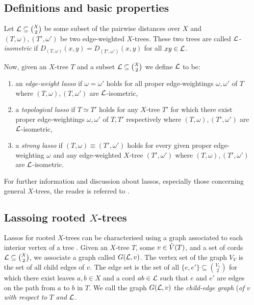 \subsection{Definitions and basic properties}
\label{sec:defin-basic-prop}

Let ${\mathcal L} \subseteq {X \choose 2}$ be some subset of the pairwise distances
over $X$ and $(T,\omega), (T',\omega')$ be two edge-weighted $X$-trees.  These
two trees are called \textit{${\mathcal L}$-isometric} if $D_{(T,\omega)}(x,y) =
D_{(T',\omega')}(x,y)$ for all $xy \in {\mathcal L}$.

Now, given an $X$-tree $T$ and a subset ${\mathcal L} \subseteq {X \choose 2}$ we
define ${\mathcal L}$ to be:
\begin{enumerate}[label=(\roman*)]
\item an \textit{edge-weight lasso} if $\omega = \omega'$ holds for all proper
  edge-weightings $\omega,\omega'$ of $T$ where $(T,\omega),(T,\omega')$ are
  ${\mathcal L}$-isometric,
\item a \textit{topological lasso} if $T \simeq T'$ holds for any $X$-tree
  $T'$ for which there exist proper edge-weightings $\omega,\omega'$ of $T,T'$
  respectively where $(T,\omega),(T',\omega')$ are ${\mathcal L}$-isometric,
\item a \textit{strong lasso} if $(T,\omega) \equiv (T',\omega')$ holds for
  every given proper edge-weighting $\omega$ and any edge-weighted $X$-tree
  $(T',\omega')$ where $(T,\omega),(T',\omega')$ are ${\mathcal L}$-isometric.
\end{enumerate}

For further information and discussion about lassos, especially those
concerning general $X$-trees, the reader is referred to \citep{DHS11}.

\subsection{Lassoing rooted $X$-trees}
\label{sec:lassoing-rooted-x}

Lassos for rooted $X$-trees can be characterised using a graph associated to
each interior vertex of a tree \citep{HP13}.  Given an $X$-tree $T$, some $v
\in \mathring{V}(T)$, and a set of cords ${\mathcal L} \subseteq {X \choose 2}$, we associate a
graph called $G({\mathcal L},v)$.  The vertex set of the graph $V_V$ is the set of all
child edges of $v$.  The edge set is the set of all $\{e,e'\} \subseteq {V_v
  \choose 2}$ for which there exist leaves $a,b \in X$ and a cord $ab \in {\mathcal L}$
such that $e$ and $e'$ are edges on the path from $a$ to $b$ in $T$.  We call
the graph $G({\mathcal L},v)$ the \textit{child-edge graph} (\textit{of $v$ with
  respect to $T$ and ${\mathcal L}$}.

